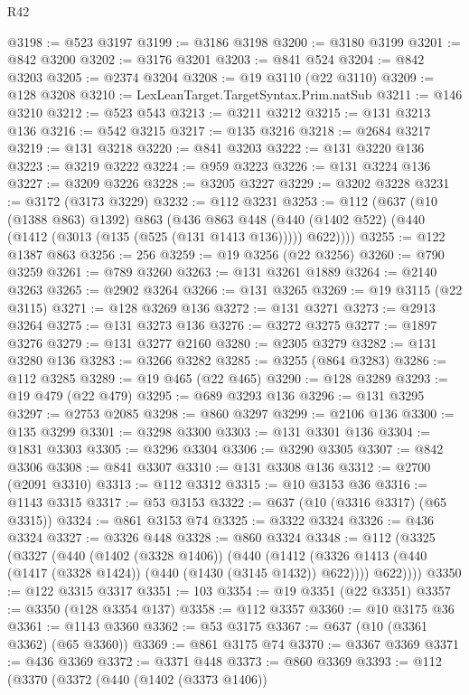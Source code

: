 \begin{lexlean}{R42}
\begin{coremodule}
@3198 := @523 @3197
@3199 := @3186 @3198
@3200 := @3180 @3199
@3201 := @842 @3200
@3202 := @3176 @3201
@3203 := @841 @524
@3204 := @842 @3203
@3205 := @2374 @3204
@3208 := @19 @3110 (@22 @3110)
@3209 := @128 @3208
@3210 := LexLeanTarget.TargetSyntax.Prim.natSub
@3211 := @146 @3210
@3212 := @523 @543
@3213 := @3211 @3212
@3215 := @131 @3213 @136
@3216 := @542 @3215
@3217 := @135 @3216
@3218 := @2684 @3217
@3219 := @131 @3218
@3220 := @841 @3203
@3222 := @131 @3220 @136
@3223 := @3219 @3222
@3224 := @959 @3223
@3226 := @131 @3224 @136
@3227 := @3209 @3226
@3228 := @3205 @3227
@3229 := @3202 @3228
@3231 := @3172 (@3173 @3229)
@3232 := @112 @3231
@3253 := @112
    (@637
      (@10 (@1388 @863) @1392)
      @863
      (@436
        @863
        @448
        (@440 (@1402 @522) (@440 (@1412 (@3013 (@135 (@525 (@131 @1413 @136))))) @622))))
@3255 := @122 @1387 @863
@3256 := 256
@3259 := @19 @3256 (@22 @3256)
@3260 := @790 @3259
@3261 := @789 @3260
@3263 := @131 @3261 @1889
@3264 := @2140 @3263
@3265 := @2902 @3264
@3266 := @131 @3265
@3269 := @19 @3115 (@22 @3115)
@3271 := @128 @3269 @136
@3272 := @131 @3271
@3273 := @2913 @3264
@3275 := @131 @3273 @136
@3276 := @3272 @3275
@3277 := @1897 @3276
@3279 := @131 @3277 @2160
@3280 := @2305 @3279
@3282 := @131 @3280 @136
@3283 := @3266 @3282
@3285 := @3255 (@864 @3283)
@3286 := @112 @3285
@3289 := @19 @465 (@22 @465)
@3290 := @128 @3289
@3293 := @19 @479 (@22 @479)
@3295 := @689 @3293 @136
@3296 := @131 @3295
@3297 := @2753 @2085
@3298 := @860 @3297
@3299 := @2106 @136
@3300 := @135 @3299
@3301 := @3298 @3300
@3303 := @131 @3301 @136
@3304 := @1831 @3303
@3305 := @3296 @3304
@3306 := @3290 @3305
@3307 := @842 @3306
@3308 := @841 @3307
@3310 := @131 @3308 @136
@3312 := @2700 (@2091 @3310)
@3313 := @112 @3312
@3315 := @10 @3153 @36
@3316 := @1143 @3315
@3317 := @53 @3153
@3322 := @637 (@10 (@3316 @3317) (@65 @3315))
@3324 := @861 @3153 @74
@3325 := @3322 @3324
@3326 := @436 @3324
@3327 := @3326 @448
@3328 := @860 @3324
@3348 := @112
    (@3325
      (@3327
        (@440
          (@1402 (@3328 @1406))
          (@440
            (@1412 (@3326 @1413 (@440 (@1417 (@3328 @1424)) (@440 (@1430 (@3145 @1432)) @622))))
            @622))))
@3350 := @122 @3315 @3317
@3351 := 103
@3354 := @19 @3351 (@22 @3351)
@3357 := @3350 (@128 @3354 @137)
@3358 := @112 @3357
@3360 := @10 @3175 @36
@3361 := @1143 @3360
@3362 := @53 @3175
@3367 := @637 (@10 (@3361 @3362) (@65 @3360))
@3369 := @861 @3175 @74
@3370 := @3367 @3369
@3371 := @436 @3369
@3372 := @3371 @448
@3373 := @860 @3369
@3393 := @112
    (@3370
      (@3372
        (@440
          (@1402 (@3373 @1406))

\end{coremodule}
\end{lexlean}
